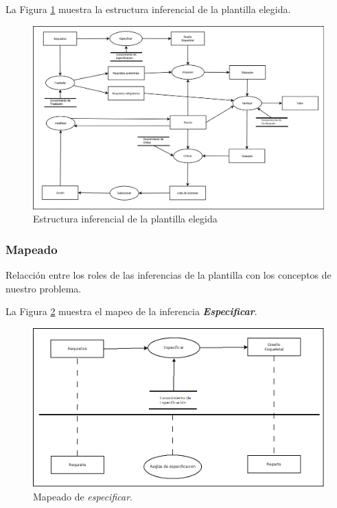 La Figura \ref{fig:EstructuraInferencial} muestra la estructura inferencial de la plantilla elegida.
\begin{figure}[H]
  \centering
  \includegraphics[scale=0.30]{imaxes/EstructuraInferencial.png}
  \caption{\label{fig:EstructuraInferencial}Estructura inferencial de la plantilla elegida}
\end{figure}

\subsubsection{Mapeado}

Relacción entre los roles de las inferencias de la plantilla con los conceptos de nuestro problema.

La Figura \ref{fig:Especificar} muestra el mapeo de la inferencia \textbf{\textit{Especificar}}.

\begin{figure}[H]
  \centering
  \includegraphics[scale=0.35]{imaxes/Especificar.png}
  \caption{\label{fig:Especificar}Mapeado de \textit{especificar}.}
\end{figure}

